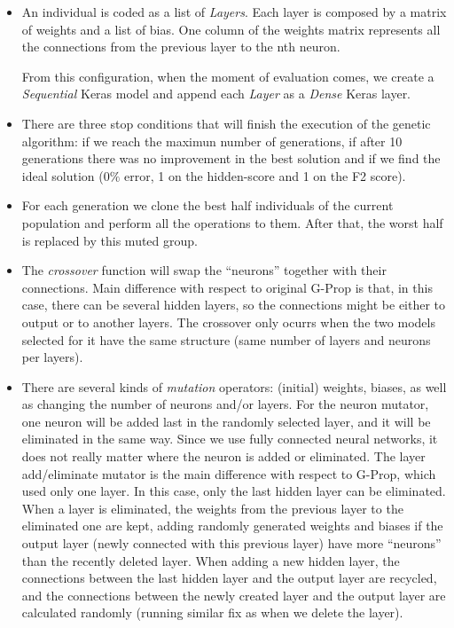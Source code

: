 \documentclass[runningheads]{llncs}
\begin{document}
\begin{itemize}

  \item An individual is coded as a list of \emph{Layers}. Each layer is
    composed by a matrix of weights and a list of bias. One column of the
    weights matrix represents all the connections from the previous layer to the
    nth neuron.

    From this configuration, when the moment of evaluation comes, we create a
    \emph{Sequential} \cite{keras-sequential}  Keras \cite{keras-nn} model and
    append each \emph{Layer} as a \emph{Dense} \cite{keras-dense} Keras layer.

  \item There are three stop conditions that will finish the execution of the
    genetic algorithm: if we reach the maximun number of generations, if after
    10 generations there was no improvement in the best solution and if we find
    the ideal solution ($0\%$ error, 1 on the hidden-score and 1 on the F2
    score).

  \item For each generation we clone the best half individuals of the current
    population and perform all the operations to them. After that, the worst
    half is replaced by this muted group.

  \item The {\em crossover} function will swap the ``neurons'' together with
    their connections. Main difference with respect to original G-Prop is that,
    in this case, there can be several hidden layers, so the connections might
    be either to output or to another layers. The crossover only ocurrs when
    the two models selected for it have the same structure (same number of
    layers and neurons per layers).


  \item There are several kinds of {\em mutation} operators: (initial) weights,
    biases, as well as changing the number of neurons and/or
    layers. For the neuron mutator, one neuron will be added last in the
    randomly selected layer, and it will be eliminated in the same way. Since
    we use fully connected neural networks, it does not really matter where the
    neuron is added or eliminated. The layer add/eliminate mutator is the
    main difference with respect to G-Prop, which used only one
    layer. In this case, only the last hidden layer can be eliminated. When a
    layer is eliminated, the weights from the previous layer to the eliminated
    one are kept, adding randomly generated weights and biases if the output
    layer (newly connected with this previous layer) have more ``neurons'' than
    the recently deleted layer. When adding a new hidden layer, the connections
    between the last hidden layer and the output layer are recycled, and the
    connections between the newly created layer and the output layer are
    calculated randomly (running similar fix as when we delete the layer).


\end{itemize}
\end{document}
